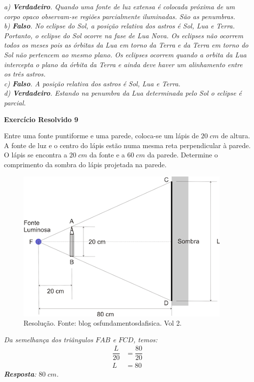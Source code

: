 \documentclass[11pt,twocolumn,oneside]{article}
\newenvironment{resposta*}
  {\bf Resposta:\\ }
  {}
\begin{document}
\begin{resposta*}
{\it a) \textbf{Verdadeiro}. Quando uma fonte de luz extensa é colocada próxima de um corpo opaco observam-se regiões parcialmente iluminadas. São as penumbras. \\
b) \textbf{Falso}. No eclipse do Sol, a posição relativa dos astros é Sol, Lua e Terra. Portanto, o eclipse do Sol ocorre na fase de Lua Nova. Os eclipses não ocorrem todos os meses pois as órbitas da Lua em torno da Terra e da Terra em torno do Sol não pertencem ao mesmo plano. Os eclipses ocorrem quando a orbita da Lua intercepta o plano da órbita da Terra e ainda deve haver um alinhamento entre os três astros. \\
c) \textbf{Falso}. A posição relativa dos astros é Sol, Lua e Terra. \\
d) \textbf{Verdadeiro}. Estando na penumbra da Lua determinada pelo Sol o eclipse é parcial. \\}
\end{resposta*}

\textbf{Exercício Resolvido 9}


Entre uma fonte puntiforme e uma parede, coloca-se um lápis de $20\;cm$ de altura. A fonte de luz e o centro do lápis estão numa mesma reta perpendicular à parede. O lápis se encontra a $20\;cm$ da fonte e a $60\;cm$ da parede. Determine o comprimento da sombra do lápis projetada na parede.


\begin{figure}[h]{}
\centering\includegraphics[width=2.5truein]{imgexe1.png}
\caption{Resolução. Fonte: blog osfundamentosdafisica. Vol 2.}
\centering
\end{figure}

\begin{resposta*}
{\it Da semelhança dos triângulos $FAB$ e $FCD$, temos:
\begin{align*}
    \dfrac{L}{20} &= \dfrac{80}{20} \\
    L &= 80
\end{align*}
\textbf{Resposta}: $80\;cm$.}
\end{resposta*}
\end{document}
